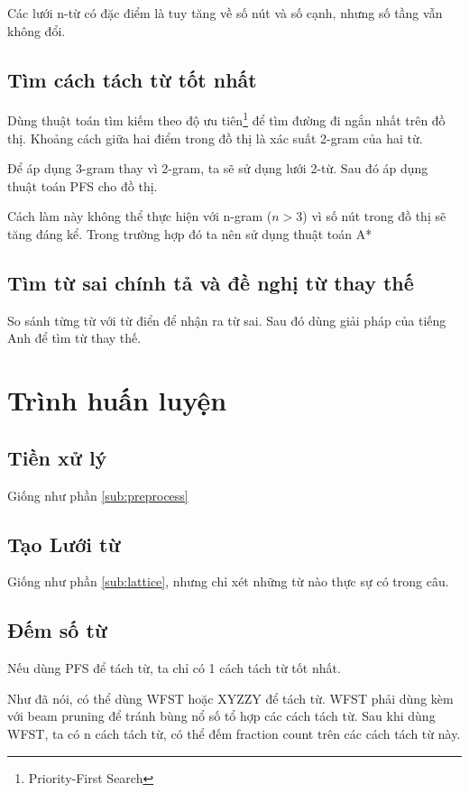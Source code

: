 \documentclass[a4paper]{book}
\begin{document}
Các lưới n-từ có đặc điểm là tuy tăng về số nút và số cạnh, nhưng số
tầng vẫn không đổi.

\subsection{Tìm cách tách từ tốt nhất}

Dùng thuật toán tìm kiếm theo độ ưu tiên\footnote{Priority-First
  Search} để tìm đường đi ngắn nhất trên đồ thị. Khoảng cách giữa hai
  điểm trong đồ thị là xác suất 2-gram của hai từ.

Để áp dụng 3-gram thay vì 2-gram, ta sẽ sử dụng lưới 2-từ. Sau đó áp
dụng thuật toán PFS cho đồ thị.

Cách làm này không thể thực hiện với n-gram ($n > 3$) vì số nút
trong đồ thị sẽ tăng đáng kể. Trong trường hợp đó ta nên sử dụng
thuật toán A*


\subsection{Tìm từ sai chính tả và đề nghị từ thay thế}

So sánh từng từ với từ điển để nhận ra từ sai. Sau đó dùng giải pháp
của tiếng Anh để tìm từ thay thế.


\section{Trình huấn luyện}

\subsection{Tiền xử lý}
Giống như phần \ref{sub:preprocess}


\subsection{Tạo Lưới từ}
Giống như phần \ref{sub:lattice}, nhưng chỉ xét những từ nào thực sự
có trong câu.


\subsection{Đếm số từ}

Nếu dùng PFS để tách từ, ta chỉ có 1 cách tách từ tốt nhất.

Như đã nói, có thể dùng WFST hoặc XYZZY để tách từ. WFST phải dùng kèm
với beam pruning để tránh bùng nổ số tổ hợp các cách tách từ. Sau khi
dùng WFST, ta có n cách tách từ, có thể đếm fraction count trên các
cách tách từ này.
\end{document}
